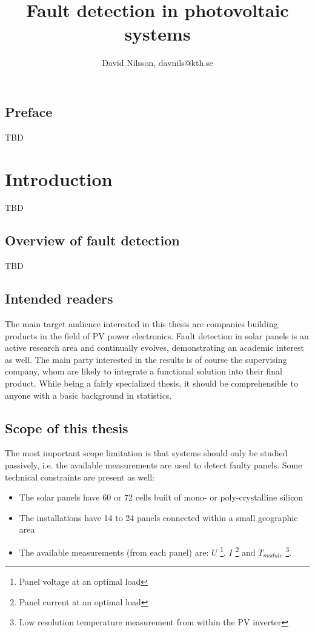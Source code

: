 
\title{Fault detection in photovoltaic systems}
\author{David Nilsson, davnils@kth.se}



\maketitle


\section*{Preface}
TBD

\tableofcontents
\printglossaries
{}

\chapter{Introduction}
TBD

\section{Overview of fault detection}
TBD

\section{Intended readers}
The main target audience interested in this thesis are companies building products in the field of PV power electronics.
Fault detection in solar panels is an active research area and continually evolves, demonstrating an academic interest as well.
The main party interested in the results is of course the supervising company, whom are likely to
integrate a functional solution into their final product.
While being a fairly specialized thesis, it should be comprehensible to anyone with a basic background in statistics.

\section{Scope of this thesis}
The most important scope limitation is that systems should only be studied passively, i.e. the available measurements are used to detect faulty panels.  
Some technical constraints are present as well:
\begin{itemize}
\item The solar panels have 60 or 72 cells built of mono- or poly-crystalline silicon

\item The installations have 14 to 24 panels connected within a small geographic area

\item The available measurements (from each panel) are:
$U$ \footnote{Panel voltage at an optimal load},
$I$ \footnote{Panel current at an optimal load} and
$T_{module}$ \footnote{Low resolution temperature measurement from within the PV inverter}.

\end{itemize}

